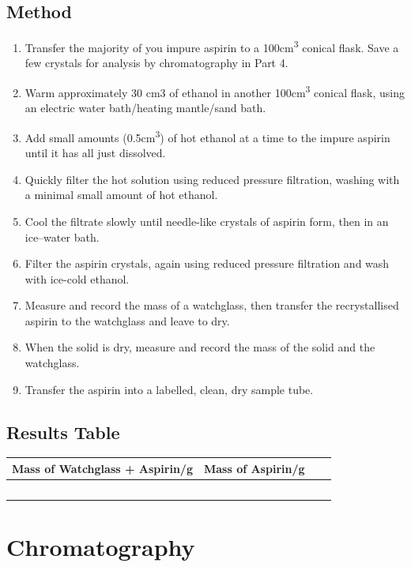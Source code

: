\section{Method}
\begin{enumerate}
    \item Transfer the majority of you impure aspirin to a 100\si{\centi\meter\cubed} conical flask. Save a few crystals for analysis by chromatography in Part 4.
    \newpage
    \item Warm approximately 30 cm3 of ethanol in another 100\si{\centi\meter\cubed} conical flask, using an electric water bath/heating mantle/sand bath. 
    \item Add small amounts (0.5\si{\centi\meter\cubed}) of hot ethanol at a time to the impure aspirin until it has all just dissolved. 
    \item Quickly filter the hot solution using reduced pressure filtration, washing with a minimal small amount of hot ethanol. 
    \item Cool the filtrate slowly until needle-like crystals of aspirin form, then in an ice–water bath.
    \item Filter the aspirin crystals, again using reduced pressure filtration and wash with ice-cold ethanol.
    \item Measure and record the mass of a watchglass, then transfer the recrystallised aspirin to the watchglass and leave to dry.
    \item When the solid is dry, measure and record the mass of the solid and the watchglass.
    \item Transfer the aspirin into a labelled, clean, dry sample tube.
\end{enumerate}

\section{Results Table}
\begin{center}
\begin{tabularx}{0.8\textwidth} { 
  | >{\raggedright\arraybackslash}X
  | >{\raggedright\arraybackslash}X | }
 \hline
 Mass of Watchglass + Aspirin/g & Mass of Aspirin/g  \\
 \hline
 ㅤ&ㅤ&ㅤ& \\
\hline
\end{tabularx}
\end{center}
\chapter{Chromatography}
